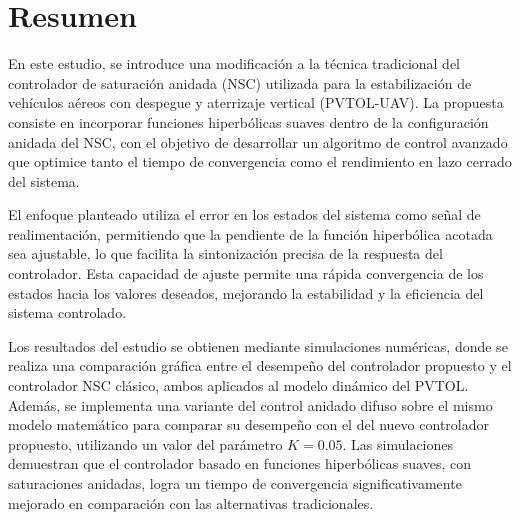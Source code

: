 \section*{Resumen}

En este estudio, se introduce una modificación a la técnica tradicional del controlador de saturación anidada (NSC) utilizada para la estabilización de vehículos aéreos con despegue y aterrizaje vertical (PVTOL-UAV). La propuesta consiste en incorporar funciones hiperbólicas suaves dentro de la configuración anidada del NSC, con el objetivo de desarrollar un algoritmo de control avanzado que optimice tanto el tiempo de convergencia como el rendimiento en lazo cerrado del sistema.

El enfoque planteado utiliza el error en los estados del sistema como señal de realimentación, permitiendo que la pendiente de la función hiperbólica acotada sea ajustable, lo que facilita la sintonización precisa de la respuesta del controlador. Esta capacidad de ajuste permite una rápida convergencia de los estados hacia los valores deseados, mejorando la estabilidad y la eficiencia del sistema controlado.

Los resultados del estudio se obtienen mediante simulaciones numéricas, donde se realiza una comparación gráfica entre el desempeño del controlador propuesto y el controlador NSC clásico, ambos aplicados al modelo dinámico del PVTOL. Además, se implementa una variante del control anidado difuso sobre el mismo modelo matemático para comparar su desempeño con el del nuevo controlador propuesto, utilizando un valor del parámetro $K = 0.05$. Las simulaciones demuestran que el controlador basado en funciones hiperbólicas suaves, con saturaciones anidadas, logra un tiempo de convergencia significativamente mejorado en comparación con las alternativas tradicionales.

